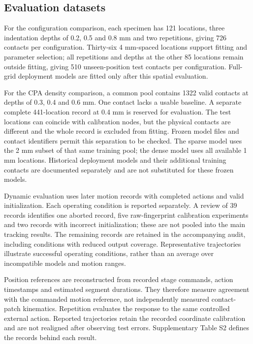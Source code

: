 \documentclass[preprint,12pt]{elsarticle}
\begin{document}
\subsection{Evaluation datasets}

For the configuration comparison, each specimen has 121 locations, three indentation depths of 0.2, 0.5 and 0.8 mm and two repetitions, giving 726 contacts per configuration. Thirty-six 4 mm-spaced locations support fitting and parameter selection; all repetitions and depths at the other 85 locations remain outside fitting, giving 510 unseen-position test contacts per configuration. Full-grid deployment models are fitted only after this spatial evaluation.

For the CPA density comparison, a common pool contains 1322 valid contacts at depths of 0.3, 0.4 and 0.6 mm. One contact lacks a usable baseline. A separate complete 441-location record at 0.4 mm is reserved for evaluation. The test locations can coincide with calibration nodes, but the physical contacts are different and the whole record is excluded from fitting. Frozen model files and contact identifiers permit this separation to be checked. The sparse model uses the 2 mm subset of that same training pool; the dense model uses all available 1 mm locations. Historical deployment models and their additional training contacts are documented separately and are not substituted for these frozen models.

Dynamic evaluation uses later motion records with completed actions and valid initialization. Each operating condition is reported separately. A review of 39 records identifies one aborted record, five raw-fingerprint calibration experiments and two records with incorrect initialization; these are not pooled into the main tracking results. The remaining records are retained in the accompanying audit, including conditions with reduced output coverage. Representative trajectories illustrate successful operating conditions, rather than an average over incompatible models and motion ranges.

Position references are reconstructed from recorded stage commands, action timestamps and estimated segment durations. They therefore measure agreement with the commanded motion reference, not independently measured contact-patch kinematics. Repetition evaluates the response to the same controlled external action. Reported trajectories retain the recorded coordinate calibration and are not realigned after observing test errors. Supplementary Table S2 defines the records behind each result.
\end{document}
